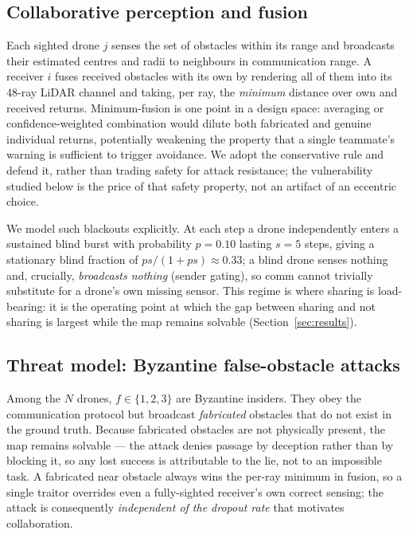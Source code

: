 \subsection{Collaborative perception and fusion}\label{sec:methods-fusion}
Each sighted drone $j$ senses the set of obstacles within its range and
broadcasts their estimated centres and radii to neighbours in
communication range. A receiver $i$ fuses received obstacles with its own by
rendering all of them into its 48-ray LiDAR channel and taking, per ray,
the \emph{minimum} distance over own and received returns. Minimum-fusion
is one point in a design space: averaging or confidence-weighted
combination would dilute both fabricated and genuine individual returns,
potentially weakening the property that a single teammate's warning is
sufficient to trigger avoidance. We adopt the conservative rule and defend
it, rather than trading safety for attack resistance; the vulnerability
studied below is the price of that safety property, not an artifact of an
eccentric choice.

We model such blackouts explicitly. At each step a drone independently
enters a sustained blind burst with probability $p=0.10$ lasting $s=5$
steps, giving a stationary blind fraction of $ps/(1+ps)\approx 0.33$; a
blind drone senses nothing and, crucially, \emph{broadcasts nothing}
(sender gating), so comm cannot trivially substitute for a drone's own
missing sensor. This regime is where sharing is load-bearing: it is the
operating point at which the gap between sharing and not sharing is largest
while the map remains solvable (Section~\ref{sec:results}).

\subsection{Threat model: Byzantine false-obstacle attacks}\label{sec:methods-threat}
Among the $N$ drones, $f\in\{1,2,3\}$ are Byzantine insiders. They obey the
communication protocol but broadcast \emph{fabricated} obstacles that do not
exist in the ground truth. Because fabricated obstacles are not physically
present, the map remains solvable --- the attack denies passage by deception
rather than by blocking it, so any lost success is attributable to the lie,
not to an impossible task. A fabricated near obstacle always wins the
per-ray minimum in fusion, so a single traitor overrides even a
fully-sighted receiver's own correct sensing; the attack is consequently
\emph{independent of the dropout rate} that motivates collaboration.

